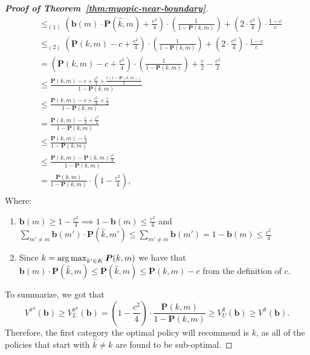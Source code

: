 \begin{proof}[\normalfont\bfseries Proof of Theorem~\ref{thm:myopic-near-boundary}]
\begin{align*}
        &\leq_{(1)} \left( \bm b(m) \cdot \bm{P}(\hat{k}, m) + \frac{c^2}{4} \right) \cdot \left( \frac{1}{1 - \bm{P}(k, m)} \right) + \left( 2 \cdot \frac{c^2}{4} \right) \cdot \frac{1-c}{c} \\
        &\leq_{(2)} \left(\bm{P}(k, m) - c + \frac{c^2}{4} \right) \cdot \left( \frac{1}{1 - \bm{P}(k, m)} \right) + \left( 2 \cdot \frac{c^2}{4} \right) \cdot \frac{1-c}{c} \\
        &= \left(\bm{P}(k, m) - c + \frac{c^2}{4} \right) \cdot \left( \frac{1}{1 - \bm{P}(k, m)} \right) + \frac{c}{2} - \frac{c^2}{2} \\
        &\leq \frac{\bm{P}(k, m) - c + \frac{c^2}{4} + \frac{c (1- \bm P(k, m))}{2}}{1 - \bm{P}(k, m)} \\
        &\leq \frac{\bm{P}(k, m) - c + \frac{c^2}{4} + \frac{c}{2}}{1 - \bm{P}(k, m)} \\
        &= \frac{\bm{P}(k, m) - \frac{c}{2} + \frac{c^2}{4}}{1 - \bm{P}(k, m)} \\
        &\leq \frac{\bm{P}(k, m) - \frac{c}{4}}{1 - \bm{P}(k, m)} \\
        &\leq \frac{\bm{P}(k, m) - \bm{P}(k, m) \frac{c^2}{4}}{1 - \bm{P}(k, m)} \\
        &= \frac{\bm{P}(k, m)}{1 - \bm{P}(k, m)} \cdot \left( 1 - \frac{c^2}{4} \right), \\
    \end{align*}
    Where:
    \begin{enumerate}
        \item $\bm b(m) \geq 1 - \frac{c^2}{4} \implies 1 - \bm b(m) \leq \frac{c^2}{4}$ and $\sum_{m' \neq m} \bm b(m') \cdot \bm{P}(\hat{k}, m') \leq \sum_{m' \neq m} \bm b(m') = 1-\bm b(m) \leq \frac{c^2}{4}$
        \item Since $k = \operatorname*{arg\,max}_{k' \in K} \bm P(k, m)$ we have that $\bm b(m) \cdot \bm{P}(\hat{k}, m) \leq \bm{P}(\hat{k}, m) \leq \bm{P}(k, m) -c$ from the definition of $c$.
    \end{enumerate}
    To summarize, we got that 
    \[
    V^{\pi^k}(\bm b) \geq V^{\pi^k}_{L}(\bm{b}) = \left( 1 - \frac{c^2}{4} \right) \cdot \frac{\bm{P}(k, m)}{1 - \bm{P}(k, m)} \geq V^{\hat{\pi}}_{U}(\bm{b}) \geq V^{\hat{\pi}}(\bm{b}).
    \]
    Therefore, the first category the optimal policy will recommend is $k$, as all of the policies that start with $\hat k \neq k$ are found to be sub-optimal.
\end{proof}

